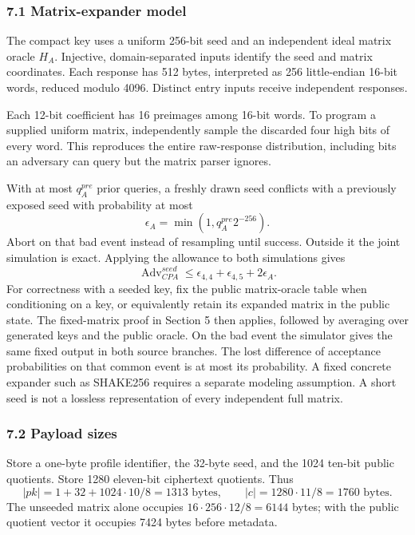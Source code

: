 \documentclass[
  10pt,
  a4paper,
]{article}
\begin{document}
\subsubsection{7.1 Matrix-expander model}\label{matrix-expander-model}

The compact key uses a uniform 256-bit seed and an independent ideal
matrix oracle \(H_A\). Injective, domain-separated inputs identify the
seed and matrix coordinates. Each response has 512 bytes, interpreted as
256 little-endian 16-bit words, reduced modulo 4096. Distinct entry
inputs receive independent responses.

Each 12-bit coefficient has 16 preimages among 16-bit words. To program
a supplied uniform matrix, independently sample the discarded four high
bits of every word. This reproduces the entire raw-response
distribution, including bits an adversary can query but the matrix
parser ignores.

With at most \(q_A^{pre}\) prior queries, a freshly drawn seed conflicts
with a previously exposed seed with probability at most \[
\epsilon_A=\min(1,q_A^{pre}2^{-256}).
\] Abort on that bad event instead of resampling until success. Outside
it the joint simulation is exact. Applying the allowance to both
simulations gives \[
\operatorname{Adv}_{CPA}^{seed}\le\epsilon_{4,4}+\epsilon_{4,5}+2\epsilon_A.
\] For correctness with a seeded key, fix the public matrix-oracle table
when conditioning on a key, or equivalently retain its expanded matrix
in the public state. The fixed-matrix proof in Section 5 then applies,
followed by averaging over generated keys and the public oracle. On the
bad event the simulator gives the same fixed output in both source
branches. The lost difference of acceptance probabilities on that common
event is at most its probability. A fixed concrete expander such as
SHAKE256 requires a separate modeling assumption. A short seed is not a
lossless representation of every independent full matrix.

\subsubsection{7.2 Payload sizes}\label{payload-sizes}

Store a one-byte profile identifier, the 32-byte seed, and the 1024
ten-bit public quotients. Store 1280 eleven-bit ciphertext quotients.
Thus \[
|pk|=1+32+1024\cdot10/8=1313\text{ bytes},\qquad
|c|=1280\cdot11/8=1760\text{ bytes}.
\] The unseeded matrix alone occupies \(16\cdot256\cdot12/8=6144\)
bytes; with the public quotient vector it occupies 7424 bytes before
metadata.
\end{document}
